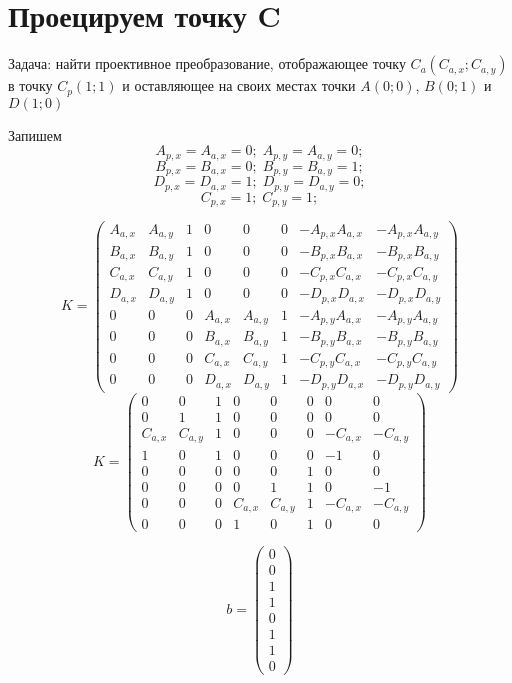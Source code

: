 \section{Проецируем точку C}

Задача: найти проективное преобразование, отображающее точку $C_a(C_{a,x};C_{a,y})$ в точку $C_p(1;1)$ и оставляющее на своих местах точки $A(0;0)$, $B(0;1)$ и $D(1;0)$

Запишем
$$ A_{p,x} = A_{a,x} = 0;\; A_{p,y} = A_{a,y} = 0;$$
$$ B_{p,x} = B_{a,x} = 0;\; B_{p,y} = B_{a,y} = 1;$$
$$ D_{p,x} = D_{a,x} = 1;\; D_{p,y} = D_{a,y} = 0;$$
$$ C_{p,x} = 1;\; C_{p,y} = 1;$$


$$
K = \begin{pmatrix}
		A_{a,x} & A_{a,y} & 1 & 0   & 0   & 0 & -A_{p,x}A_{a,x} & -A_{p,x}A_{a,y} \\
		B_{a,x} & B_{a,y} & 1 & 0   & 0   & 0 & -B_{p,x}B_{a,x} & -B_{p,x}B_{a,y} \\
		C_{a,x} & C_{a,y} & 1 & 0   & 0   & 0 & -C_{p,x}C_{a,x} & -C_{p,x}C_{a,y} \\
		D_{a,x} & D_{a,y} & 1 & 0   & 0   & 0 & -D_{p,x}D_{a,x} & -D_{p,x}D_{a,y} \\
		0   & 0   & 0 & A_{a,x} & A_{a,y} & 1 & -A_{p,y}A_{a,x} & -A_{p,y}A_{a,y} \\
		0   & 0   & 0 & B_{a,x} & B_{a,y} & 1 & -B_{p,y}B_{a,x} & -B_{p,y}B_{a,y} \\
		0   & 0   & 0 & C_{a,x} & C_{a,y} & 1 & -C_{p,y}C_{a,x} & -C_{p,y}C_{a,y} \\
		0   & 0   & 0 & D_{a,x} & D_{a,y} & 1 & -D_{p,y}D_{a,x} & -D_{p,y}D_{a,y}
\end{pmatrix}
$$
$$
K = \begin{pmatrix}
		0 & 0 & 1 & 0   & 0   & 0 & 0 & 0 \\
		0 & 1 & 1 & 0   & 0   & 0 & 0 & 0 \\
		C_{a,x} & C_{a,y} & 1 & 0 & 0 & 0 & -C_{a,x} & -C_{a,y} \\
		1 & 0 & 1 & 0   & 0   & 0 & -1 & 0 \\
		0   & 0   & 0 & 0 & 0 & 1 & 0 & 0 \\
		0   & 0   & 0 & 0 & 1 & 1 & 0 & -1 \\
		0   & 0   & 0 & C_{a,x} & C_{a,y} & 1 & -C_{a,x} & -C_{a,y} \\
		0   & 0   & 0 & 1 & 0 & 1 & 0 & 0
\end{pmatrix}
$$

$$
b = \begin{pmatrix}
		0\\
		0\\
		1\\
		1\\
		0\\
		1\\
		1\\
		0
	\end{pmatrix}
$$

